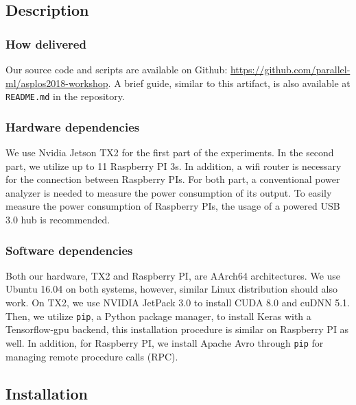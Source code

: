 \documentclass[sigplan]{acmart}
\begin{document}
\subsection{Description}
%
%
\subsubsection{How delivered}
Our source code and scripts are available on Github: \url{https://github.com/parallel-ml/asplos2018-workshop}.
A brief guide, similar to this artifact, is also available at \texttt{README.md} in the repository.

%
%
\subsubsection{Hardware dependencies}
We use Nvidia Jetson TX2 for the first part of the experiments. In the second part, we utilize up to 11 Raspberry PI 3s. In addition, a wifi router is necessary for the connection between Raspberry PIs. For both part, a conventional power analyzer is needed to measure the power consumption of its output. To easily measure the power consumption of Raspberry PIs, the usage of a powered USB 3.0 hub is recommended.

%
%
\subsubsection{Software dependencies}
Both our hardware, TX2 and Raspberry PI, are AArch64 architectures. We use Ubuntu 16.04 on both systems, however, similar Linux distribution should also work. On TX2, we use NVIDIA JetPack 3.0 to install CUDA 8.0 and cuDNN 5.1. Then, we utilize \texttt{pip}, a Python package manager, to install Keras with a Tensorflow-gpu backend, this installation procedure is similar on Raspberry PI as well. In addition, for Raspberry PI, we install Apache Avro through \texttt{pip} for managing remote procedure calls (RPC). 



\subsection{Installation}
\end{document}
